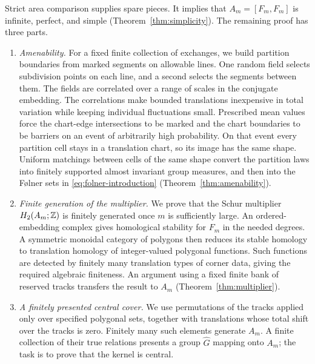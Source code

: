 Strict area comparison supplies spare pieces. It implies that
$A_m=[F_m,F_m]$ is infinite, perfect, and simple
(Theorem~\ref{thm:simplicity}). The remaining proof has three parts.
\begin{enumerate}[leftmargin=*,label=\textup{\arabic*.}]
\item \emph{Amenability.}
For a fixed finite collection of exchanges, we build partition
boundaries from marked segments on allowable lines. One random
field selects subdivision points on each line, and a second
selects the segments between them. The fields are correlated over
a range of scales in the conjugate embedding. The correlations make
bounded translations inexpensive in total variation while keeping
individual fluctuations small. Prescribed mean values force the
chart-edge intersections to be marked and the chart boundaries
to be barriers on an event of arbitrarily high probability.
On that event every partition cell stays in a translation chart,
so its image has the same shape. Uniform matchings between cells
of the same shape convert the partition laws into finitely
supported almost invariant group measures, and then into the
F\o lner sets in
\eqref{eq:folner-introduction}
(Theorem~\ref{thm:amenability}).

\item \emph{Finite generation of the multiplier.}
We prove that the Schur multiplier $H_2(A_m;\mathbb Z)$ is finitely
generated once $m$ is sufficiently large. An ordered-embedding complex gives homological
stability for $F_m$ in the needed degrees. A symmetric monoidal
category of polygons then reduces its stable homology to translation
homology of integer-valued polygonal functions. Such functions are
detected by finitely many translation types of corner data, giving
the required algebraic finiteness. An argument using a fixed finite
bank of reserved tracks transfers the result to $A_m$ (Theorem~\ref{thm:multiplier}).

\item \emph{A finitely presented central cover.}
We use permutations of the tracks applied only over specified
polygonal sets, together with translations whose total shift over
the tracks is zero. Finitely many such elements generate $A_m$.
A finite collection of their true relations presents a group
$\widehat G$ mapping onto $A_m$; the task is to prove that the
kernel is central.


\end{enumerate}
